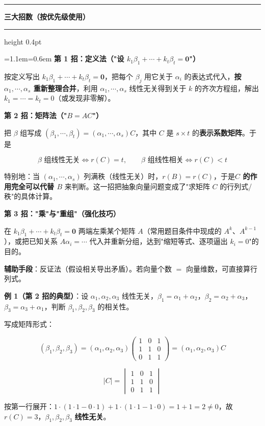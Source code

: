 \documentclass[11pt,openany,UTF8]{ctexbook}
\newcommand{\callouthead}[2]{%
  \par\addvspace{7pt}\noindent
  {\color{#1}\rule[-0.15em]{3pt}{1.05em}}\hspace{0.5em}%
  {\bfseries\color{#1}#2}\par\nobreak\vspace{-0.35em}%
  {\color{rulesep}\hrule height 0.4pt}\nobreak\vspace{0.45em}%
  \begingroup\small\setlength{\parindent}{0pt}%
  \leftskip=1.1em\rightskip=0.6em\noindent\ignorespaces}
\newcommand{\calloutend}{\par\endgroup\addvspace{7pt}}
\newenvironment{callkey}[1]{\callouthead{keybar}{#1}}{\calloutend}
\begin{document}
\begin{callkey}{三大招数（按优先级使用）}
\textbf{第 1 招：定义法（"设 $k_1\beta_1+\cdots+k_t\beta_t=\mathbf{0}$"）}

按定义写出 $k_1\beta_1+\cdots+k_t\beta_t=\mathbf{0}$，把每个 $\beta_j$ 用它关于 $\alpha_i$ 的表达式代入，\textbf{按 $\alpha_1,\cdots,\alpha_s$ 重新整理合并}，利用 $\alpha_1,\cdots,\alpha_s$ 线性无关得到关于 $k$ 的齐次方程组，解出 $k_1=\cdots=k_t=0$（或发现非零解）。

\textbf{第 2 招：矩阵法（"$B=AC$"）}

把 $\beta$ 组写成 $(\beta_1,\cdots,\beta_t)=(\alpha_1,\cdots,\alpha_s)C$，其中 $C$ 是 $s\times t$ 的\textbf{表示系数矩阵}。于是

\[\beta \text{ 组线性无关}\iff r(C)=t,\qquad \beta \text{ 组线性相关}\iff r(C)<t\]

特别地：当 $(\alpha_1,\cdots,\alpha_s)$ 列满秩（线性无关）时，$r(B)=r(C)$，于是\textbf{$C$ 的作用完全可以代替 $B$} 来判断。这一招把抽象向量问题变成了"求矩阵 $C$ 的行列式/秩"的具体计算。

\textbf{第 3 招："乘"与"重组"（强化技巧）}

在 $k_1\beta_1+\cdots+k_t\beta_t=\mathbf{0}$ 两端左乘某个矩阵 $A$（常用题目条件中现成的 $A^k$、$A^{k-1}$），或把已知关系 $A\alpha_i=\cdots$ 代入并重新分组，达到"缩短等式、逐项逼出 $k_i=0$"的目的。

\textbf{辅助手段}：反证法（假设相关导出矛盾）。若向量个数 $=$ 向量维数，可直接算行列式。

\end{callkey}

\textbf{例 1（第 2 招的典型）}：设 $\alpha_1,\alpha_2,\alpha_3$ 线性无关，$\beta_1=\alpha_1+\alpha_2$，$\beta_2=\alpha_2+\alpha_3$，$\beta_3=\alpha_3+\alpha_1$，判断 $\beta_1,\beta_2,\beta_3$ 的相关性。

写成矩阵形式：

\[(\beta_1,\beta_2,\beta_3)=(\alpha_1,\alpha_2,\alpha_3)\begin{pmatrix} 1 & 0 & 1 \\ 1 & 1 & 0 \\ 0 & 1 & 1 \end{pmatrix}=(\alpha_1,\alpha_2,\alpha_3)C\]

\[\vert C\vert=\begin{vmatrix} 1 & 0 & 1 \\ 1 & 1 & 0 \\ 0 & 1 & 1 \end{vmatrix}\]

按第一行展开：$1\cdot(1\cdot1-0\cdot1)+1\cdot(1\cdot1-1\cdot0)=1+1=2\ne 0$，故 $r(C)=3$，$\beta_1,\beta_2,\beta_3$ \textbf{线性无关}。
\end{document}
